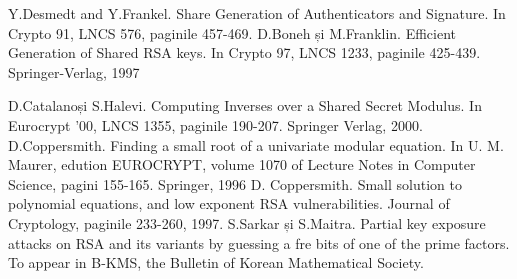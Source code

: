 \documentclass[12]{report}
\begin{document}
\medskip


\begin{thebibliography}{9}
Y.Desmedt and Y.Frankel. Share Generation of Authenticators and Signature. In Crypto 91, LNCS 576, paginile 457-469.
D.Boneh și M.Franklin. Efficient Generation of Shared RSA keys. In Crypto 97, LNCS 1233, paginile 425-439. Springer-Verlag, 1997

D.Catalanoși S.Halevi. Computing Inverses over a Shared Secret Modulus. In Eurocrypt '00, LNCS 1355, paginile 190-207. Springer Verlag, 2000.
D.Coppersmith. Finding a small root of a univariate modular equation. In U. M. Maurer, edution EUROCRYPT, volume 1070 of Lecture Notes in Computer Science, pagini 155-165. Springer, 1996
D. Coppersmith. Small solution to polynomial equations, and low exponent RSA vulnerabilities. Journal of Cryptology, paginile 233-260, 1997.
S.Sarkar și S.Maitra. Partial key exposure attacks on RSA and its variants by guessing a fre bits of one of the prime factors. To appear in B-KMS, the Bulletin of Korean Mathematical Society.


\end{thebibliography}
\end{document}
